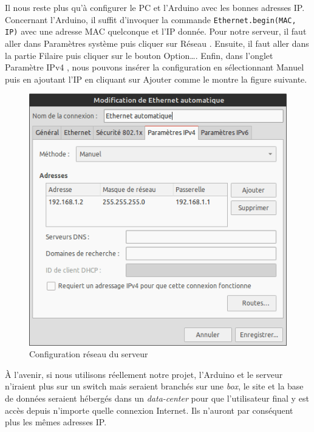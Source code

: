 Il nous reste plus qu'à configurer le PC et l'Arduino avec les bonnes adresses IP. Concernant l'Arduino, il suffit d'invoquer la commande \verb-Ethernet.begin(MAC, IP)- avec une adresse MAC quelconque et l'IP donnée. Pour notre serveur, il faut aller dans \og Paramètres système \fg{} puis cliquer sur \og Réseau \fg. Ensuite, il faut aller dans la partie \og Filaire \fg{} puis cliquer sur le bouton \og Option\dots \fg. Enfin, dans l'onglet \og Paramètre IPv4 \fg, nous pouvons insérer la configuration en sélectionnant \og Manuel \fg{} puis en ajoutant l'IP en cliquant sur \og Ajouter \fg{} comme le montre la figure suivante.

\begin{figure}[!h]
	\centering
	\includegraphics[width=.5\linewidth]{Images/Parametres_reseau_Linux}
	\caption{Configuration réseau du serveur}
\end{figure}

À l'avenir, si nous utilisons réellement notre projet, l'Arduino et le serveur n'iraient plus sur un switch mais seraient branchés sur une \emph{box}, le site et la base de données seraient hébergés dans un \emph{data-center} pour que l'utilisateur final y est accès depuis n'importe quelle connexion Internet. Ils n'auront par conséquent plus les mêmes adresses IP.
